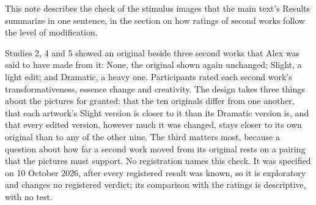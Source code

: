 
This note describes the check of the stimulus images that the main text's Results summarize in one sentence, in the section on how ratings of second works follow the level of modification.

Studies 2, 4 and 5 showed an original beside three second works that Alex was said to have made from it: None, the original shown again unchanged; Slight, a light edit; and Dramatic, a heavy one. Participants rated each second work's transformativeness, essence change and creativity. The design takes three things about the pictures for granted: that the ten originals differ from one another, that each artwork's Slight version is closer to it than its Dramatic version is, and that every edited version, however much it was changed, stays closer to its own original than to any of the other nine. The third matters most, because a question about how far a second work moved from its original rests on a pairing that the pictures must support. No registration names this check. It was specified on 10 October 2026, after every registered result was known, so it is exploratory and changes no registered verdict; its comparison with the ratings is descriptive, with no test.

